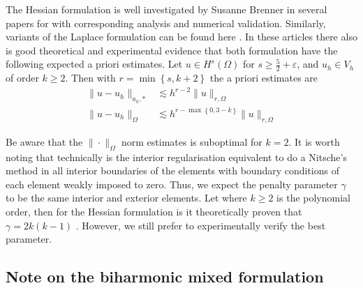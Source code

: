 \documentclass[11pt]{article}
\theoremstyle{remark}
\renewcommand{\ge}{\geqslant}
\numberwithin{equation}{section}
\begin{document}
The Hessian formulation is well investigated by Susanne Brenner in several papers for \cite{brenner2012, brenner2012quadratic, brenner2012quadratic_kirk} with corresponding analysis and numerical validation. Similarly, variants of the Laplace formulation can be found here
\cite{feng2007fully, georgoulis2009discontinuous}. In these articles there also is good theoretical and experimental evidence that both formulation have the following expected a priori estimates. Let  $u \in H^{s}( \Omega ) $ for $s\ge  \frac{5}{2} + \varepsilon$, and $u_{h}\in
V_{h}  $ of order $k\ge 2$. Then with $r = \min\left\{ s,
k+2 \right\}$ the a priori estimates are   \[
    \begin{split}
\| u - u_{h} \|_{ a_{h},*  }^{  }  & \lesssim  h^{r-2} \| u \|_{ r, \Omega  }^{  } \\
\| u - u_{h} \|_{ \Omega   }^{  }  & \lesssim  h^{r- \max_{}\left\{ 0, 3-k \right\}  } \| u \|_{ r,\Omega  }^{  }
    \end{split}
\]

Be aware that the $\| \cdot  \|_{\Omega   }^{  } $ norm estimates is suboptimal for $k=2$.
It is worth noting that technically is the interior regularisation equivalent to do a Nitsche's method in all interior boundaries of the elements with boundary conditions of each element weakly
imposed to zero. Thus, we expect the penalty parameter $\gamma$ to be the same interior and exterior elements. Let where $k\ge 2$ is the polynomial order, then for the Hessian formulation is it theoretically proven that $\gamma = 2k ( k-1 ) $
\cite{brenner2012quadratic, brenner2012}. However, we still prefer to experimentally verify the best parameter.


\subsection{Note on the biharmonic mixed formulation}%
\label{subsec:biharmonic_mixed_formulation}
\end{document}
